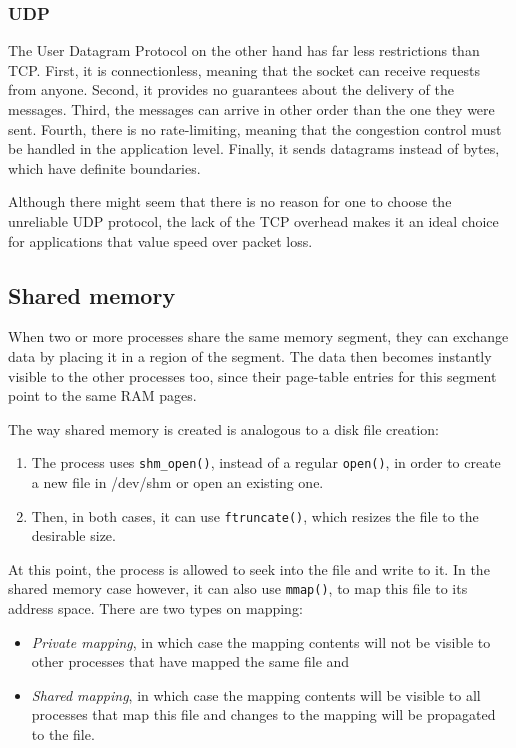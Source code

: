 \subsubsection{UDP}

The User Datagram Protocol on the other hand has far less restrictions than 
TCP. First, it is connectionless, meaning that the socket can receive requests 
from anyone. Second, it provides no guarantees about the delivery of the 
messages. Third, the messages can arrive in other order than the one they were 
sent. Fourth, there is no rate-limiting, meaning that the congestion control 
must be handled in the application level. Finally, it sends datagrams instead 
of bytes, which have definite boundaries.

Although there might seem that there is no reason for one to choose the 
unreliable UDP protocol, the lack of the TCP overhead makes it an ideal choice 
for applications that value speed over packet loss.

\subsection{Shared memory}

When two or more processes share the same memory segment, they can exchange 
data by placing it in a region of the segment. The data then becomes instantly 
visible to the other processes too, since their page-table entries for this 
segment point to the same RAM pages.

The way shared memory is created is analogous to a disk file creation:

\begin{enumerate}
	\item The process uses \texttt{shm\_open()}, instead of a regular 
		\texttt{open()}, in order to create a new file in /dev/shm or 
		open an existing one.
	\item Then, in both cases, it can use \texttt{ftruncate()}, which 
		resizes the file to the desirable size.
\end{enumerate}

At this point, the process is allowed to seek into the file and write to it. In 
the shared memory case however, it can also use \texttt{mmap()}, to map this 
file to its address space. There are two types on mapping:

\begin{itemize}
	\item \textit{Private mapping}, in which case the mapping contents will 
		not be visible to other processes that have mapped the same 
		file and
	\item \textit{Shared mapping}, in which case the mapping contents will 
		be visible to all processes that map this file and changes to 
		the mapping will be propagated to the file.
\end{itemize}

